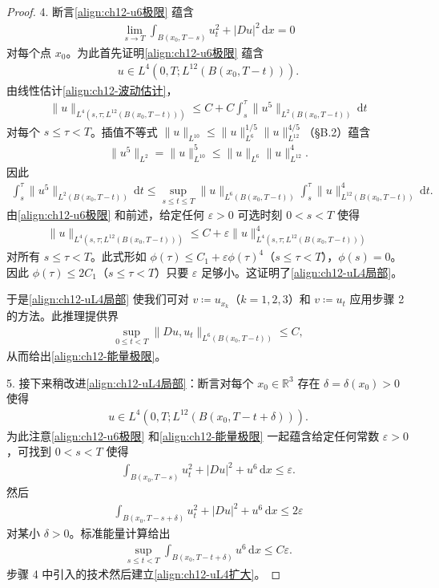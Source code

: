 \documentclass[../../main.tex]{subfiles}
\begin{document}
\begin{proof}
4. 断言\eqref{align:ch12-u6极限} 蕴含
\begin{align}
\lim_{s\to T}\int_{B(x_0,T-s)}u_t^2+|Du|^2\,\mathrm{d}x=0
\label{align:ch12-能量极限}
\end{align}
对每个点 $x_0$。为此首先证明\eqref{align:ch12-u6极限} 蕴含
\begin{align}
u\in L^4(0,T;L^{12}(B(x_0,T-t))).
\label{align:ch12-uL4局部}
\end{align}
由线性估计\eqref{align:ch12-波动估计}，
\begin{align*}
\|u\|_{L^4(s,\tau;L^{12}(B(x_0,T-t)))} \leqslant C+C\int_s^\tau\|u^5\|_{L^2(B(x_0,T-t))}\,\mathrm{d}t
\end{align*}
对每个 $s\leqslant\tau<T$。插值不等式 $\|u\|_{L^{10}}\leqslant\|u\|_{L^6}^{1/5}\|u\|_{L^{12}}^{4/5}$（\S B.2）蕴含
\begin{align*}
\|u^5\|_{L^2}=\|u\|_{L^{10}}^5\leqslant\|u\|_{L^6}\|u\|_{L^{12}}^4.
\end{align*}
因此
\begin{align*}
\int_s^\tau\|u^5\|_{L^2(B(x_0,T-t))}\,\mathrm{d}t\leqslant\sup_{s\leqslant t\leqslant T}\|u\|_{L^6(B(x_0,T-t))}\int_s^\tau\|u\|_{L^{12}(B(x_0,T-t))}^4\,\mathrm{d}t.
\end{align*}
由\eqref{align:ch12-u6极限} 和前述，给定任何 $\varepsilon>0$ 可选时刻 $0<s<T$ 使得
\begin{align*}
\|u\|_{L^4(s,\tau;L^{12}(B(x_0,T-t)))}\leqslant C+\varepsilon\|u\|_{L^4(s,\tau;L^{12}(B(x_0,T-t)))}^4
\end{align*}
对所有 $s\leqslant\tau<T$。此式形如 $\phi(\tau)\leqslant C_1+\varepsilon\phi(\tau)^4$（$s\leqslant\tau<T$），$\phi(s)=0$。因此 $\phi(\tau)\leqslant 2C_1$（$s\leqslant\tau<T$）只要 $\varepsilon$ 足够小。这证明了\eqref{align:ch12-uL4局部}。

于是\eqref{align:ch12-uL4局部} 使我们可对 $v\coloneqq u_{x_k}$（$k=1,2,3$）和 $v\coloneqq u_t$ 应用步骤 2 的方法。此推理提供界
\begin{align*}
\sup_{0\leqslant t<T}\|Du,u_t\|_{L^6(B(x_0,T-t))}\leqslant C,
\end{align*}
从而给出\eqref{align:ch12-能量极限}。

5. 接下来稍改进\eqref{align:ch12-uL4局部}：断言对每个 $x_0\in\mathbb{R}^3$ 存在 $\delta=\delta(x_0)>0$ 使得
\begin{align}
u\in L^4(0,T;L^{12}(B(x_0,T-t+\delta))).
\label{align:ch12-uL4扩大}
\end{align}
为此注意\eqref{align:ch12-u6极限} 和\eqref{align:ch12-能量极限} 一起蕴含给定任何常数 $\varepsilon>0$，可找到 $0<s<T$ 使得
\begin{align*}
\int_{B(x_0,T-s)}u_t^2+|Du|^2+u^6\,\mathrm{d}x\leqslant\varepsilon.
\end{align*}
然后
\begin{align*}
\int_{B(x_0,T-s+\delta)}u_t^2+|Du|^2+u^6\,\mathrm{d}x\leqslant 2\varepsilon
\end{align*}
对某小 $\delta>0$。标准能量计算给出
\begin{align*}
\sup_{s\leqslant t<T}\int_{B(x_0,T-t+\delta)}u^6\,\mathrm{d}x\leqslant C\varepsilon.
\end{align*}
步骤 4 中引入的技术然后建立\eqref{align:ch12-uL4扩大}。


\end{proof}
\end{document}
